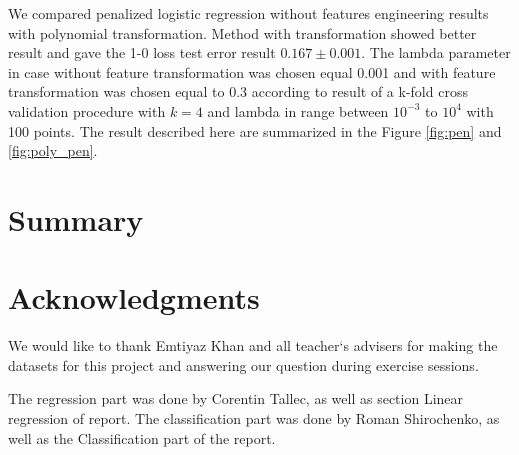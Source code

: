 \documentclass{article} %
\begin{document}
We compared penalized logistic regression without features engineering results with polynomial transformation. Method with transformation showed better result and gave the 1-0 loss test error result  $0.167\pm0.001$. The lambda parameter in case without feature transformation was chosen equal 0.001 and with feature transformation was chosen equal to 0.3 according to result of a k-fold cross validation procedure with $k=4$ and lambda in range between $10^{-3}$ to $10^4$  with 100 points. The result described here are summarized in the Figure \ref{fig:pen} and \ref{fig:poly_pen}.

\begin{figure}[!t]
\center
{}
\hfill
\caption{}
\end{figure}

\section{Summary}


\section{Acknowledgments}
We would like to thank Emtiyaz Khan and all teacher`s advisers for making the datasets for this project and answering our question during exercise sessions.

The regression part was done by Corentin Tallec, as well as section Linear regression of report. The classification part was done by Roman Shirochenko, as well as the Classification part of the report.
\end{document}
